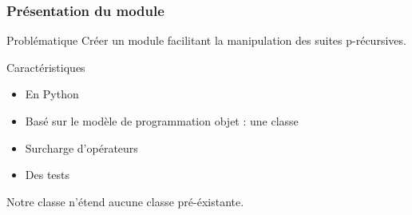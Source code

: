 \documentclass{beamer}
\begin{document}
\begin{frame}
\frametitle{Présentation du module}
\begin{center}
\begin{alertblock}{Problématique}
    Créer un module facilitant la manipulation des suites p-récursives.
\end{alertblock}
\vspace{0.6cm}
\begin{block}{Caractéristiques}
    \begin{itemize}
        \item {\footnotesize En Python}
        \item Basé sur le modèle de programmation objet : une classe
        \item Surcharge d'opérateurs
        \item Des tests
    \end{itemize}
\end{block}
\vspace{0.6cm}
Notre classe n'étend aucune classe pré-éxistante.
\end{center}
\end{frame}
\end{document}
